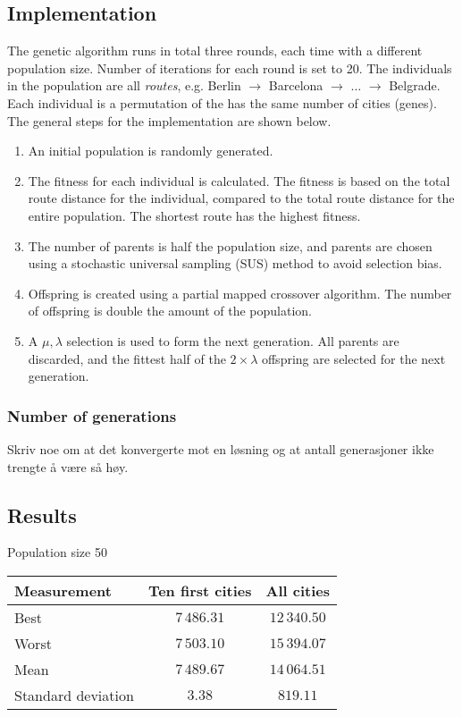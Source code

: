 \documentclass{article}
\begin{document}
\subsection*{Implementation}

The genetic algorithm runs in total three rounds, each time with a different population size. Number of iterations for each round is set to 20. The individuals in the population are all \textit{routes}, e.g. Berlin $\rightarrow$ Barcelona $\rightarrow$ $\ldots$ $\rightarrow$ Belgrade. Each individual is a permutation of the  has the same number of cities (genes).
The general steps for the implementation are shown below.

\begin{enumerate}
    \item An initial population is randomly generated.
    \item The fitness for each individual is calculated. The fitness is based on the total route distance for the individual, compared to the total route distance for the entire population. The shortest route has the highest fitness.
    \item The number of parents is half the population size, and parents are chosen using a stochastic universal sampling (SUS) method to avoid selection bias.
    \item Offspring is created using a partial mapped crossover algorithm. The number of offspring is double the amount of the population.
    \item A $\mu,\lambda$ selection is used to form the next generation. All parents are discarded, and the fittest half of the $2 \times \lambda$ offspring are selected for the next generation.
\end{enumerate}

\subsubsection*{Number of generations}

Skriv noe om at det konvergerte mot en løsning og at antall generasjoner ikke trengte å være så høy.

\subsection*{Results}

Population size 50

\begin{center}
\begin{tabular}{lcc}
\toprule
Measurement & Ten first cities & All cities \\
\midrule
Best & $7\,486.31$ & $12\,340.50$ \\
Worst & $7\,503.10$ & $15\,394.07$ \\
Mean & $7\,489.67$ & $14\,064.51$ \\
Standard deviation & $3.38$ & $819.11$ \\
\bottomrule
\end{tabular}
\end{center}
\end{document}
